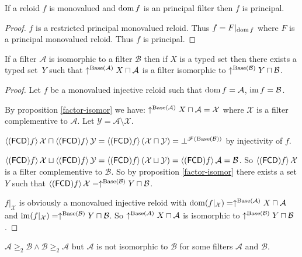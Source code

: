 \begin{thm}
If a reloid $f$ is monovalued and $\operatorname{dom} f$ is an principal filter
then $f$ is principal.\end{thm}
\begin{proof}
$f$ is a restricted principal monovalued reloid. Thus $f=F|_{\operatorname{dom} f}$
where $F$ is a principal monovalued reloid. Thus $f$ is principal.\end{proof}
\begin{lem}
If a filter $\mathcal{A}$ is isomorphic to a filter $\mathcal{B}$
then if $X$ is a typed set then there exists a typed set~$Y$ such that $\uparrow^{\operatorname{Base}(\mathcal{A})}X\sqcap\mathcal{A}$
is a filter isomorphic to $\uparrow^{\operatorname{Base}(\mathcal{B})}Y\sqcap\mathcal{B}$.\end{lem}
\begin{proof}
Let $f$ be a monovalued injective reloid such that $\operatorname{dom} f=\mathcal{A}$,
$\operatorname{im} f=\mathcal{B}$.

By proposition \ref{factor-isomor} we have: $\uparrow^{\operatorname{Base}(\mathcal{A})}X\sqcap\mathcal{A}=\mathcal{X}$
where $\mathcal{X}$ is a filter complementive to $\mathcal{A}$.
Let $\mathcal{Y}=\mathcal{A}\setminus\mathcal{X}$.

$\left\langle (\mathsf{FCD}) f\right\rangle\mathcal{X}\sqcap\left\langle (\mathsf{FCD}) f\right\rangle\mathcal{Y}=\left\langle (\mathsf{FCD}) f\right\rangle(\mathcal{X}\sqcap\mathcal{Y})=\bot^{\mathscr{F}(\operatorname{Base}(\mathcal{B}))}$
by injectivity of $f$.

$\left\langle (\mathsf{FCD}) f\right\rangle\mathcal{X}\sqcup\left\langle (\mathsf{FCD}) f\right\rangle\mathcal{Y}=\left\langle (\mathsf{FCD}) f\right\rangle(\mathcal{X}\sqcup\mathcal{Y})=\left\langle (\mathsf{FCD}) f\right\rangle\mathcal{A}=\mathcal{B}$.
So $\left\langle (\mathsf{FCD}) f\right\rangle\mathcal{X}$ is a filter complementive to $\mathcal{B}$.
So by proposition \ref{factor-isomor} there exists a set $Y$ such
that $\left\langle (\mathsf{FCD}) f\right\rangle\mathcal{X}=\uparrow^{\operatorname{Base}(\mathcal{B})}Y\sqcap\mathcal{B}$.

$f|_{\mathcal{X}}$ is obviously a monovalued injective reloid with
$\operatorname{dom}(f|_{\mathcal{X}})=\uparrow^{\operatorname{Base}(\mathcal{A})}X\sqcap\mathcal{A}$
and $\operatorname{im}(f|_{\mathcal{X}})=\uparrow^{\operatorname{Base}(\mathcal{B})}Y\sqcap\mathcal{B}$.
So $\uparrow^{\operatorname{Base}(\mathcal{A})}X\sqcap\mathcal{A}$ is isomorphic
to $\uparrow^{\operatorname{Base}(\mathcal{B})}Y\sqcap\mathcal{B}$.\end{proof}
\begin{example}
$\mathcal{A}\ge_{2}\mathcal{B}\wedge\mathcal{B}\ge_{2}\mathcal{A}$
but $\mathcal{A}$ is not isomorphic to $\mathcal{B}$ for some filters
$\mathcal{A}$ and $\mathcal{B}$.\end{example}
